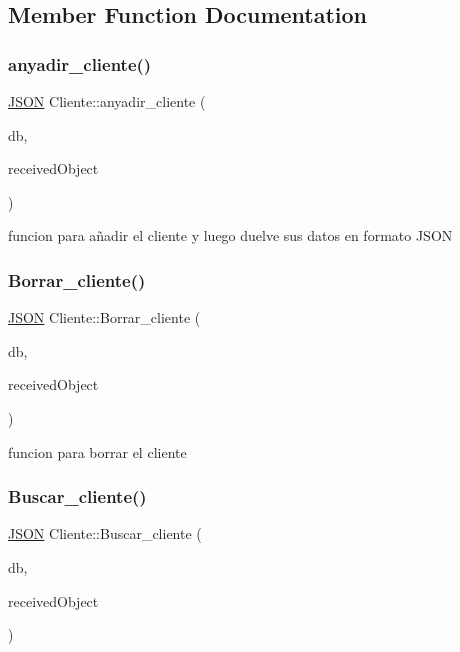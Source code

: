 \subsection{Member Function Documentation}
\mbox{\label{classCliente_a7411b49f5697dbb2eb47bff72f5681d4}} 
\subsubsection{\texorpdfstring{anyadir\+\_\+cliente()}{anyadir\_cliente()}}
{\footnotesize\ttfamily \mbox{\hyperlink{classnlohmann_1_1basic__json}{J\+S\+ON}} Cliente\+::anyadir\+\_\+cliente (\begin{DoxyParamCaption}\item[{Q\+Sql\+Database}]{db,  }\item[{\mbox{\hyperlink{classnlohmann_1_1basic__json}{J\+S\+ON}}}]{received\+Object }\end{DoxyParamCaption})}

funcion para añadir el cliente y luego duelve sus datos en formato J\+S\+ON\mbox{\label{classCliente_ae439ec32dce5171c876e9a6210ca8633}} 
\subsubsection{\texorpdfstring{Borrar\+\_\+cliente()}{Borrar\_cliente()}}
{\footnotesize\ttfamily \mbox{\hyperlink{classnlohmann_1_1basic__json}{J\+S\+ON}} Cliente\+::\+Borrar\+\_\+cliente (\begin{DoxyParamCaption}\item[{Q\+Sql\+Database}]{db,  }\item[{\mbox{\hyperlink{classnlohmann_1_1basic__json}{J\+S\+ON}}}]{received\+Object }\end{DoxyParamCaption})}

funcion para borrar el cliente\mbox{\label{classCliente_ac448f4e423f0e60d706e5e20e88212a9}} 
\subsubsection{\texorpdfstring{Buscar\+\_\+cliente()}{Buscar\_cliente()}}
{\footnotesize\ttfamily \mbox{\hyperlink{classnlohmann_1_1basic__json}{J\+S\+ON}} Cliente\+::\+Buscar\+\_\+cliente (\begin{DoxyParamCaption}\item[{Q\+Sql\+Database}]{db,  }\item[{\mbox{\hyperlink{classnlohmann_1_1basic__json}{J\+S\+ON}}}]{received\+Object }\end{DoxyParamCaption})}

